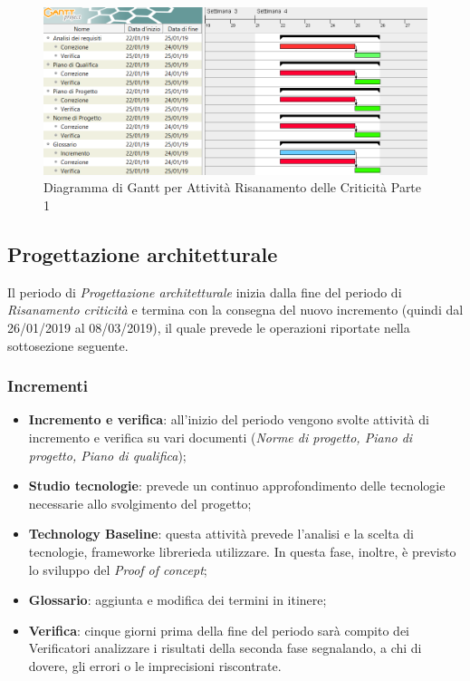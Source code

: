 \begin{figure}[h]
	\centering
  		\includegraphics[width=1.0\linewidth]{./images/RisanamentoCriticita1.png}
  		\caption{Diagramma di Gantt per Attività Risanamento delle Criticità Parte 1}
  		\label{fig:Gantt Risananmento Criticità 1}
\end{figure}

\subsection{Progettazione architetturale}

Il periodo di \textit{Progettazione architetturale} inizia dalla fine del periodo di \textit{Risanamento criticità} e termina con la consegna del nuovo incremento (quindi dal 26/01/2019 al 08/03/2019), il quale prevede le operazioni riportate nella sottosezione seguente.

\subsubsection{Incrementi}
\begin{itemize}
	\item \textbf{Incremento e verifica}: all'inizio del periodo vengono svolte attività di incremento e verifica su vari documenti (\textit{Norme di progetto, Piano di progetto, Piano di qualifica});
	\item \textbf{Studio tecnologie}: prevede un continuo approfondimento delle tecnologie necessarie allo svolgimento del progetto; 
	\item \textbf{Technology Baseline}\glossario: questa attività prevede l'analisi e la scelta di tecnologie, framework\glossario e librerie\glossario da utilizzare. In questa fase, inoltre, è previsto lo sviluppo del \textit{Proof of concept}\glossario;
	\item \textbf{Glossario}: aggiunta e modifica dei termini in itinere;  
	\item \textbf{Verifica}: cinque giorni prima della fine del periodo sarà compito dei Verificatori analizzare i risultati della seconda fase segnalando, a chi di dovere, gli errori o le imprecisioni riscontrate.
\end{itemize}

